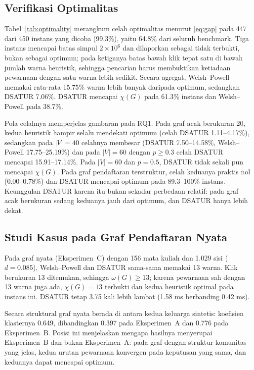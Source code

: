 \documentclass[conference,a4paper]{IEEEtran}
\begin{document}
\subsection{Verifikasi Optimalitas}
Tabel~\ref{tab:optimality} merangkum celah optimalitas menurut \eqref{eq:gap}
pada 447 dari 450 instans yang dicoba (99.3\%), yaitu 64.8\% dari seluruh
benchmark. Tiga instans mencapai batas simpul $2\times10^{6}$ dan dilaporkan
sebagai tidak terbukti, bukan sebagai optimum; pada ketiganya batas bawah klik
tepat satu di bawah jumlah warna heuristik, sehingga pencarian harus membuktikan
ketiadaan pewarnaan dengan satu warna lebih sedikit. Secara agregat,
Welsh--Powell memakai rata-rata 15.75\% warna lebih banyak daripada optimum,
sedangkan DSATUR 7.06\%. DSATUR mencapai $\chi(G)$ pada 61.3\% instans dan
Welsh--Powell pada 38.7\%.



Pola celahnya memperjelas gambaran pada RQ1. Pada graf acak berukuran 20, kedua
heuristik hampir selalu mendekati optimum (celah DSATUR 1.11--4.17\%), sedangkan
pada $|V|=40$ celahnya membesar (DSATUR 7.50--14.58\%, Welsh--Powell
17.75--25.19\%) dan pada $|V|=60$ dengan $p\ge 0.3$ celah DSATUR mencapai
15.91--17.14\%. Pada $|V|=60$ dan $p=0.5$, DSATUR tidak sekali pun mencapai
$\chi(G)$. Pada graf pendaftaran terstruktur, celah keduanya praktis nol
(0.00--0.78\%) dan DSATUR mencapai optimum pada 89.3--100\% instans.
Keunggulan DSATUR karena itu bukan sekadar perbedaan relatif: pada graf acak
berukuran sedang keduanya jauh dari optimum, dan DSATUR hanya lebih dekat.

\subsection{Studi Kasus pada Graf Pendaftaran Nyata}
Pada graf nyata (Eksperimen~C) dengan 156 mata kuliah dan 1.029 sisi
($d=0.085$), Welsh--Powell dan DSATUR sama-sama memakai 13 warna. Klik
berukuran 13 ditemukan, sehingga $\omega(G)\ge 13$; karena pewarnaan sah dengan
13 warna juga ada, $\chi(G)=13$ terbukti dan kedua heuristik optimal pada
instans ini. DSATUR tetap 3.75 kali lebih lambat (1.58 ms berbanding 0.42 ms).

Secara struktural graf nyata berada di antara kedua keluarga sintetis:
koefisien klasternya 0.649, dibandingkan 0.397 pada Eksperimen~A dan 0.776 pada
Eksperimen~B. Posisi ini menjelaskan mengapa hasilnya menyerupai Eksperimen~B
dan bukan Eksperimen~A: pada graf dengan struktur komunitas yang jelas, kedua
urutan pewarnaan konvergen pada keputusan yang sama, dan keduanya dapat
mencapai optimum.
\end{document}
